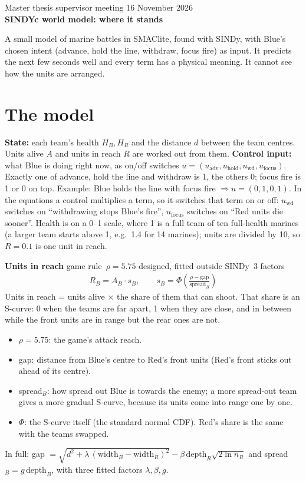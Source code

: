 \documentclass[11pt,a4paper]{article}
\newcommand{\tagbox}[2]{\colorbox{#1!12}{\textcolor{#1}{\footnotesize\textsf{#2}}}}
\newcommand{\designed}{\tagbox{designed}{designed, fitted outside SINDy}}
\newcommand{\gamerule}{\tagbox{gamerule}{game rule}}
\begin{document}
{\small Master thesis \textperiodcentered{} supervisor meeting \textperiodcentered{} 16 November 2026}\\[2pt]
{\LARGE\bfseries SINDYc world model: where it stands}

A small model of marine battles in SMAClite, found with SINDy, with Blue's chosen intent (advance,
hold the line, withdraw, focus fire) as input. It predicts the next few seconds well and every term has
a physical meaning. It cannot see how the units are arranged.

\section*{The model}

\textbf{State:} each team's health $H_B, H_R$ and the distance $d$ between the team centres.
Units alive $A$ and units in reach $R$ are worked out from them.
\textbf{Control input:} what Blue is doing right now, as on/off switches
$u = (u_{\text{adv}}, u_{\text{hold}}, u_{\text{wd}}, u_{\text{focus}})$. Exactly one of advance, hold the
line and withdraw is 1, the others 0; focus fire is 1 or 0 on top. Example: Blue holds the line with
focus fire $\Rightarrow u = (0, 1, 0, 1)$. In the equations a control multiplies a term, so it switches
that term on or off: $u_{\text{wd}}$ switches on ``withdrawing stops Blue's fire'', $u_{\text{focus}}$
switches on ``Red units die sooner''.
Health is on a 0--1 scale, where 1 is a full team of ten full-health marines (a larger team starts
above 1, e.g.\ 1.4 for 14 marines); units are divided by 10, so $R = 0.1$ is one unit in reach.

\textbf{Units in reach} \hfill \gamerule\ $\rho = 5.75$ \quad \designed\ 3 factors
\begin{align*}
  R_B = A_B \cdot s_B, \qquad
  s_B = \Phi\!\left( \frac{\rho - \text{gap}}{\text{spread}_B} \right)
\end{align*}
Units in reach = units alive $\times$ the share of them that can shoot. That share is an S-curve:
0 when the teams are far apart, 1 when they are close, and in between while the front units are in
range but the rear ones are not.
\begin{itemize}
  \item $\rho = 5.75$: the game's attack reach.
  \item gap: distance from Blue's centre to Red's front units (Red's front sticks out ahead of its centre).
  \item spread$_B$: how spread out Blue is towards the enemy; a more spread-out team gives a more
        gradual S-curve, because its units come into range one by one.
  \item $\Phi$: the S-curve itself (the standard normal CDF). Red's share is the same with the teams swapped.
\end{itemize}
{\footnotesize In full: gap $= \sqrt{d^2 + \lambda\,(\text{width}_B - \text{width}_R)^2} - \beta\,
\text{depth}_R\sqrt{2\ln n_R}$ and spread$_B = g\,\text{depth}_B$, with three fitted factors
$\lambda, \beta, g$.}
\end{document}
